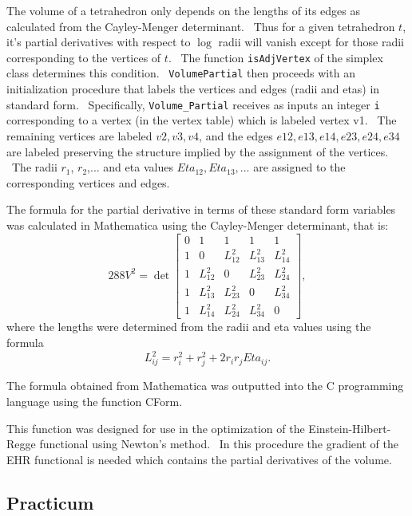 The volume of a tetrahedron only depends on the lengths of its edges as
calculated from the Cayley-Menger determinant. \ Thus for a given
tetrahedron $t$, it's partial derivatives with respect to $\log $ radii will
vanish except for those radii corresponding to the vertices of $t$. \ The
function \texttt{isAdjVertex} of the simplex class determines this
condition. \ \texttt{VolumePartial} then proceeds with an initialization
procedure that labels the vertices and edges (radii and etas) in standard
form. \ Specifically, \texttt{Volume\_Partial} receives as inputs an integer 
\texttt{i} corresponding to a vertex (in the vertex table) which is labeled
vertex v1. \ The remaining vertices are labeled $v2,v3,v4$, and the edges $%
e12,e13,e14,e23,e24,e34$ are labeled preserving the structure implied by the
assignment of the vertices. \ The radii $r_{1}$, $r_{2}$,... and eta values $%
Eta_{12},Eta_{13},$... are assigned to the corresponding vertices and edges.
\ 

The formula for the partial derivative in terms of these standard form
variables was calculated in Mathematica using the Cayley-Menger determinant,
that is:%
\begin{equation*}
288V^{2}=\det\left[ 
\begin{array}{ccccc}
0 & 1 & 1 & 1 & 1 \\ 
1 & 0 & L_{12}^{2} & L_{13}^{2} & L_{14}^{2} \\ 
1 & L_{12}^{2} & 0 & L_{23}^{2} & L_{24}^{2} \\ 
1 & L_{13}^{2} & L_{23}^{2} & 0 & L_{34}^{2} \\ 
1 & L_{14}^{2} & L_{24}^{2} & L_{34}^{2} & 0%
\end{array}
\right] ,
\end{equation*}
where the lengths were determined from the radii and eta values using the
formula%
\begin{equation*}
L_{ij}^{2}=r_{i}^{2}+r_{j}^{2}+2r_{i}r_{j}Eta_{ij}.
\end{equation*}

The formula obtained from Mathematica was outputted into the C programming
language using the function CForm. \ 

This function was designed for use in the optimization of the
Einstein-Hilbert-Regge functional using Newton's method. \ In this procedure
the gradient of the EHR functional is needed which contains the partial
derivatives of the volume. \ 

\subsection*{Practicum}

